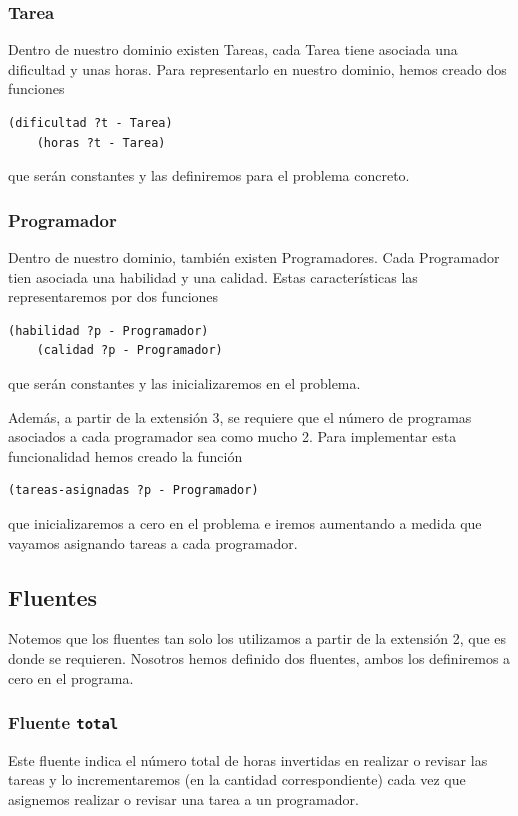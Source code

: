 \documentclass[12pt, titlepage]{article}
\begin{document}
\subsubsection{Tarea}
Dentro de nuestro dominio existen Tareas, cada Tarea tiene asociada una
dificultad y unas horas. Para representarlo en nuestro dominio, hemos creado dos
funciones
\begin{lstlisting}[language=PDDL]
    (dificultad ?t - Tarea)
    (horas ?t - Tarea)
\end{lstlisting}
que serán constantes y las definiremos para el problema concreto.

\subsubsection{Programador}
Dentro de nuestro dominio, también existen Programadores. Cada Programador tien
asociada una habilidad y una calidad. Estas características las representaremos
por dos funciones
\begin{lstlisting}[language=PDDL]
    (habilidad ?p - Programador)
    (calidad ?p - Programador)
\end{lstlisting}
que serán constantes y las inicializaremos en el problema.

Además, a partir de la extensión 3, se requiere que el número de programas
asociados a cada programador sea como mucho 2. Para implementar esta
funcionalidad hemos creado la función
\begin{lstlisting}[language=PDDL]
    (tareas-asignadas ?p - Programador)
\end{lstlisting}
que inicializaremos a cero en el problema e iremos aumentando a medida que
vayamos asignando tareas a cada programador.

\subsection{Fluentes}

Notemos que los fluentes tan solo los utilizamos a partir de la extensión 2,
que es donde se requieren. Nosotros hemos definido dos fluentes, ambos los
definiremos a cero en el programa.

\subsubsection{Fluente \texttt{total}}
Este fluente indica el número total de horas invertidas en realizar o revisar
las tareas y lo incrementaremos (en la cantidad correspondiente) cada vez que
asignemos realizar o revisar una tarea a un programador.
\end{document}

